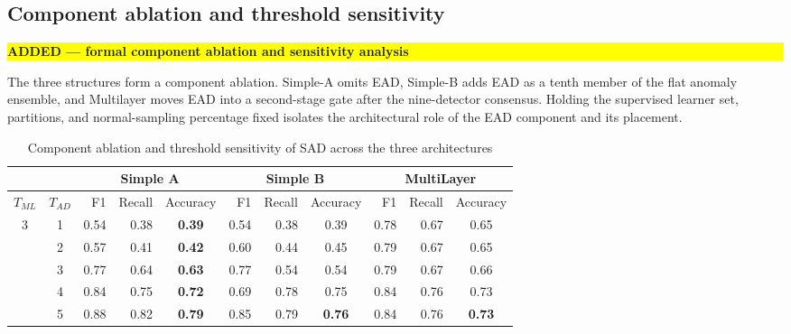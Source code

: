 \documentclass[12pt]{article}
\newcommand{\revmark}[1]{\par\noindent\colorbox{yellow}{%
  \parbox{\dimexpr\linewidth-2\fboxsep}{\raggedright\strut\textbf{#1}}}%
  \par\smallskip}
\begin{document}
\subsection*{Component ablation and threshold sensitivity}
\revmark{ADDED --- formal component ablation and sensitivity analysis}
The three structures form a component ablation. Simple-A omits EAD, Simple-B
adds EAD as a tenth member of the flat anomaly ensemble, and Multilayer moves
EAD into a second-stage gate after the nine-detector consensus. Holding the
supervised learner set, partitions, and normal-sampling percentage fixed
isolates the architectural role of the EAD component and its placement.
    \begin{table}[H]
        \centering
        \caption{Component ablation and threshold sensitivity of SAD across the three architectures}
        \label{table3}
        \scriptsize
        \begin{tabular}{rrrrrrrrrrr}
            \hline
            &&\multicolumn{3}{c}{Simple A} &  \multicolumn{3}{c}{Simple B} &  \multicolumn{3}{c}{MultiLayer} \\
            \hline
            \multicolumn{1}{c}{$T_{ML}$} & \multicolumn{1}{c}{$T_{AD}$} & F1 & Recall & \multicolumn{1}{c}{Accuracy}  & F1 & Recall & \multicolumn{1}{c}{Accuracy}  & F1 & Recall & \multicolumn{1}{c}{Accuracy}\\
            \hline
            \multicolumn{1}{c}{\multirow{5}{*}{3}} & \multicolumn{1}{c}{1}& 0.54 & 0.38 & \multicolumn{1}{c}{\textbf{0.39}} & 0.54 & 0.38 & \multicolumn{1}{c}{0.39}  & 0.78 & 0.67 & \multicolumn{1}{c}{0.65} \\
            \multicolumn{1}{c}{} & \multicolumn{1}{c}{2}& 0.57 & 0.41 & \multicolumn{1}{c}{\textbf{0.42}} & 0.60 & 0.44 & \multicolumn{1}{c}{0.45} & 0.79 & 0.67 & \multicolumn{1}{c}{0.65} \\
            \multicolumn{1}{c}{} & \multicolumn{1}{c}{3}& 0.77 & 0.64 & \multicolumn{1}{c}{\textbf{0.63}} & 0.77 & 0.54 & \multicolumn{1}{c}{0.54} & 0.79 & 0.67 & \multicolumn{1}{c}{0.66}\\
            \multicolumn{1}{c}{} & \multicolumn{1}{c}{4}& 0.84 & 0.75 & \multicolumn{1}{c}{\textbf{0.72}} & 0.69 & 0.78 & \multicolumn{1}{c}{0.75} & 0.84 & 0.76 & \multicolumn{1}{c}{0.73} \\
            \multicolumn{1}{c}{} & \multicolumn{1}{c}{5}& 0.88 & 0.82 & \multicolumn{1}{c}{\textbf{0.79}} & 0.85 & 0.79 & \multicolumn{1}{c}{\textbf{0.76}} & 0.84 & 0.76 & \multicolumn{1}{c}{\textbf{0.73}} \\

\end{tabular}
\end{table}
\end{document}
